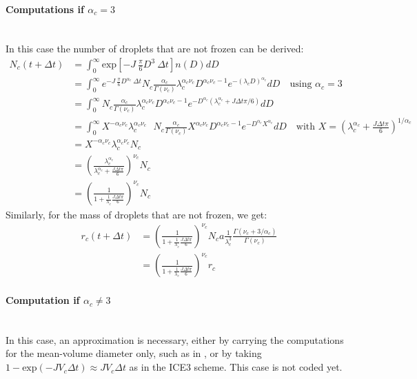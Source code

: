 \paragraph{Computations if $\alpha_c = 3$}
~\\
In this case the number of droplets that are not frozen can be derived:
\begin{align}
 N_c(t+\Delta t) &= \int_0^\infty \mathrm{exp}[ -J~\frac{\pi}{6}D^3~\Delta t ] n(D)dD \\
 &= \int_0^\infty e^{-J~\frac{\pi}{6}D^{\alpha_c}~\Delta t} N_c \frac{\alpha_c}{\Gamma(\nu_c)} \lambda_c^{\alpha_c \nu_c} D^{\alpha_c \nu_c - 1} e^{-(\lambda_c D)^{\alpha_c}} dD \quad \textrm{using~} \alpha_c = 3 \\
 &= \int_0^\infty N_c \frac{\alpha_c}{\Gamma(\nu_c)} \lambda_c^{\alpha_c \nu_c} D^{\alpha_c \nu_c - 1} e^{-D^{\alpha_c}(\lambda_c^{\alpha_c} + J \Delta t \pi / 6)} dD \\
 &= \int_0^\infty X^{-\alpha_c \nu_c} \lambda_c^{\alpha_c \nu_c} ~ ~ ~ N_c \frac{\alpha_c}{\Gamma(\nu_c)} X^{\alpha_c \nu_c} D^{\alpha_c \nu_c - 1} e^{-D^{\alpha_c} X^{\alpha_c}} dD \quad \textrm{with~} X = \left( \lambda_c^{\alpha_c} + \frac{J \Delta t \pi}{6} \right)^{1/\alpha_c} \\
 &= X^{-\alpha_c \nu_c} \lambda_c^{\alpha_c \nu_c} N_c \\
 &= \left( \frac{\lambda_c^{\alpha_c}}{\lambda_c^{\alpha_c} + \frac{J \Delta t \pi}{6}} \right)^{\nu_c} N_c\\
 &= \left( \frac{1}{1+\frac{1}{\lambda_c}\frac{J \Delta t \pi}{6}} \right)^{\nu_c} N_c
\end{align}
Similarly, for the mass of droplets that are not frozen, we get:
\begin{align}
 r_c(t+\Delta t) &= \left( \frac{1}{1+\frac{1}{\lambda_c}\frac{J \Delta t \pi}{6}} \right)^{\nu_c} N_c a \frac{1}{\lambda_c^3} \frac{\Gamma(\nu_c+3/\alpha_c)}{\Gamma(\nu_c)} \\
 &= \left( \frac{1}{1+\frac{1}{\lambda_c}\frac{J \Delta t \pi}{6}} \right)^{\nu_c} r_c
\end{align}

\paragraph{Computation if $\alpha_c \neq 3$}
~\\
In this case, an approximation is necessary, either by carrying the computations for the mean-volume diameter only, such as in \citet{Milbrandt2005b}, or by taking $1-\mathrm{exp}(-J V_c \Delta t) \approx J V_c \Delta t$ as in the ICE3 scheme. This case is not coded yet.

